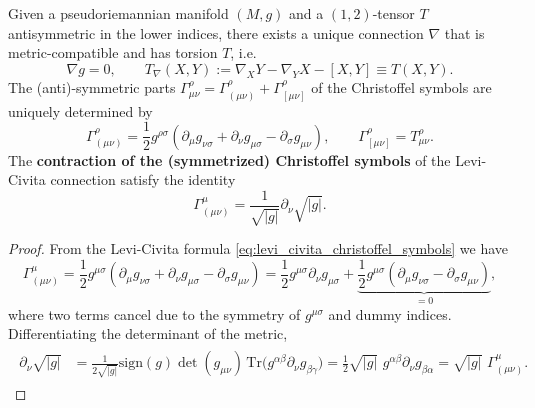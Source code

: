 \begin{mytheorem}
Given a pseudoriemannian manifold \((M,g)\) and a $(1,2)$-tensor $T$ antisymmetric in the lower indices, there exists a unique connection \(\nabla\) that is metric-compatible and has torsion \(T\), i.e. 
\begin{equation}
    \nabla g = 0,  \qquad T_\nabla(X,Y):=\nabla_XY-\nabla_YX-[X,Y]\equiv T(X,Y).
\end{equation}
The (anti)-symmetric parts $\Gamma_{\mu\nu}^\rho=\Gamma^\rho_{(\mu\nu)}+\Gamma^\rho_{[\mu\nu]}$ of the Christoffel symbols are uniquely determined by 
\begin{equation}\label{eq:levi_civita_christoffel_symbols}
    \Gamma^\rho_{(\mu\nu)}= \frac{1}{2} g^{\rho \sigma} \left( \partial_{\mu} g_{\nu \sigma} + \partial_{\nu} g_{\mu \sigma} - \partial_{\sigma} g_{\mu \nu} \right), \qquad 
    \Gamma^\rho_{[\mu\nu]}= T_{\mu \nu}^{\rho}.
\end{equation}
%
The \textbf{contraction of the (symmetrized) Christoffel symbols} of the Levi-Civita connection satisfy the identity
\begin{equation}\label{eq:metric_christoffel_contraction_identity}
    \Gamma^{\mu}_{(\mu \nu)} = \frac{1}{\sqrt{|g|}} \partial_{\nu} \sqrt{|g|}.
\end{equation}   
\end{mytheorem}
\begin{proof}
From the Levi-Civita formula \eqref{eq:levi_civita_christoffel_symbols} we have
\begin{equation}
    \Gamma^{\mu}_{(\mu \nu)} = \frac{1}{2} g^{\mu \sigma} \left( \partial_{\mu} g_{\nu \sigma} + \partial_{\nu} g_{\mu \sigma} - \partial_{\sigma} g_{\mu \nu} \right)
    = \frac{1}{2} g^{\mu \sigma} \partial_{\nu} g_{\mu \sigma} + \underbrace{\frac{1}{2} g^{\mu \sigma} \left( \partial_{\mu} g_{\nu \sigma} - \partial_{\sigma} g_{\mu \nu} \right)}_{=0},
\end{equation}
where two terms cancel due to the symmetry of \(g^{\mu \sigma}\) and dummy indices.
Differentiating the determinant of the metric, 
\begin{align}
\begin{aligned}
    \partial_{\nu} \sqrt{|g|} &= \frac{1}{2 \sqrt{|g|}} \text{sign}(g) \det(g_{\mu \nu}) \, \text{Tr}\big(g^{\alpha \beta} \partial_{\nu} g_{\beta \gamma}\big)
    = \frac{1}{2} \sqrt{|g|}\,\, g^{\alpha \beta} \partial_{\nu} g_{\beta \alpha}
    = \sqrt{|g|} \,\,\Gamma^{\mu}_{(\mu \nu)}.
\end{aligned}
\end{align}
\end{proof}


